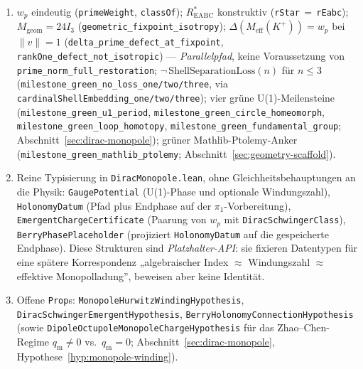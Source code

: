 \documentclass[11pt,a4paper]{article}
\begin{document}
	\begin{enumerate}
		\item[\textbf{Level~0 --- Bewiesen / Scaffold.}]
		$w_p$ eindeutig (\texttt{primeWeight}, \texttt{classOf});
		$R^*_{\mathrm{EABC}}$ konstruktiv (\texttt{rStar}\,$=$\,\texttt{rEabc});
		$M_{\mathrm{geom}}=24I_3$ (\texttt{geometric\_fixpoint\_isotropy});
		$\Delta(M_{\mathrm{eff}}(K^+))=w_p$ bei $\|v\|=1$
		(\texttt{delta\_prime\_defect\_at\_fixpoint},
		\texttt{rankOne\_defect\_not\_isotropic}) --- \emph{Parallelpfad}, keine
		Voraussetzung von \texttt{prime\_norm\_full\_restoration};
		$\neg\,\mathrm{ShellSeparationLoss}(n)$ für $n\le 3$
		(\texttt{milestone\_green\_no\_loss\_one/two/three},
		via \texttt{cardinalShellEmbedding\_one/two/three});
		vier grüne U(1)-Meilensteine
		(\texttt{milestone\_green\_u1\_period},
		\texttt{milestone\_green\_circle\_homeomorph},
		\texttt{milestone\_green\_loop\_homotopy},
		\texttt{milestone\_green\_fundamental\_group};
		Abschnitt~\ref{sec:dirac-monopole});
		grüner Mathlib-Ptolemy-Anker
		(\texttt{milestone\_green\_mathlib\_ptolemy};
		Abschnitt~\ref{sec:geometry-scaffold}).
		
		\item[\textbf{Level~1 --- API ohne \texttt{sorry}.}]
		Reine Typisierung in \texttt{DiracMonopole.lean}, ohne Gleichheitsbehauptungen
		an die Physik:
		\texttt{GaugePotential} (U(1)-Phase und optionale Windungszahl),
		\texttt{HolonomyDatum} (Pfad plus Endphase auf der $\pi_1$-Vorbereitung),
		\texttt{EmergentChargeCertificate} (Paarung von $w_p$ mit
		\texttt{DiracSchwingerClass}),
		\texttt{BerryPhasePlaceholder} (projiziert \texttt{HolonomyDatum} auf die
		gespeicherte Endphase).
		Diese Strukturen sind \emph{Platzhalter-API}: sie fixieren Datentypen für eine
		spätere Korrespondenz „algebraischer Index $\approx$ Windungszahl
		$\approx$ effektive Monopolladung'', beweisen aber keine Identität.
		
		\item[\textbf{Level~2 --- Externe Hypothesen.}]
		Offene \texttt{Prop}s:
		\texttt{MonopoleHurwitzWindingHypothesis},
		\texttt{DiracSchwingerEmergentHypothesis},
		\texttt{BerryHolonomyConnectionHypothesis}
		(sowie \texttt{DipoleOctupoleMonopoleChargeHypothesis} für das
		Zhao--Chen-Regime $q_{\mathrm m}\neq 0$ vs.\ $q_{\mathrm m}=0$;
		Abschnitt~\ref{sec:dirac-monopole}, Hypothese~\ref{hyp:monopole-winding}).
	\end{enumerate}
	
\end{document}
